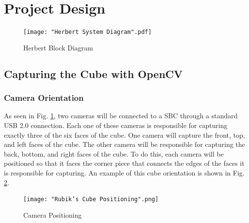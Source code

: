 \documentclass[final, letterpaper, 10 pt, conference, onecolumn]{IEEEtran}
\begin{document}

\section{Project Design}
\label{sec:Project Design}

\begin{figure}[!ht]
\centering
\texttt{[image: "Herbert System Diagram".pdf]}
\caption{Herbert Block Diagram}
\label{fig:System Block Diagram}
\end{figure}

\subsection{Capturing the Cube with OpenCV}
\label{sec:opencv}

\subsubsection{Camera Orientation}
As seen in Fig. \ref{fig:System Block Diagram}, two cameras will be connected to a SBC through a standard USB 2.0 connection. Each one of these cameras is responsible for capturing exactly three of the six faces of the cube. One camera will capture the front, top, and left faces of the cube. The other camera will be responsible for capturing the back, bottom, and right faces of the cube. To do this, each camera will be positioned so that it faces the corner piece that connects the edges of the faces it is responsible for capturing. An example of this cube orientation is shown in Fig. \ref{fig:Camera Positioning}.

\begin{figure}[!ht]
\centering
\texttt{[image: "Rubik's Cube Positioning".png]}
\caption{Camera Positioning}
\label{fig:Camera Positioning}
\end{figure}
\end{document}
